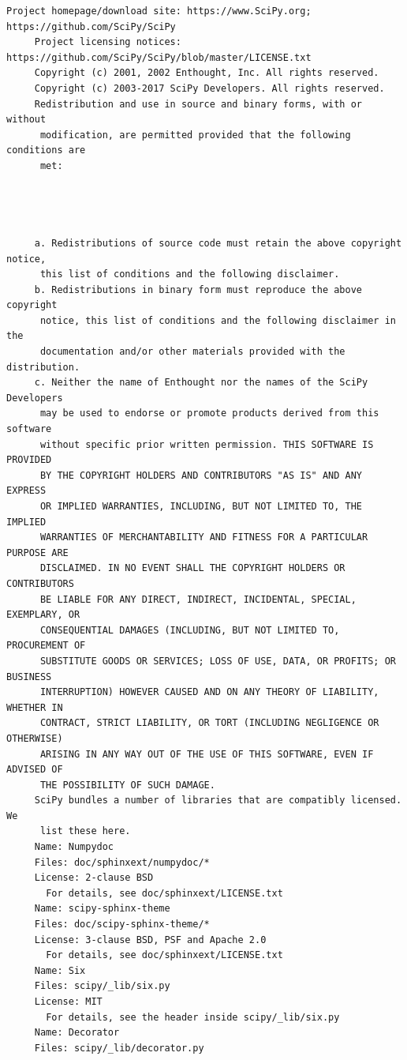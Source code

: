 \begin{lstlisting}[basicstyle=\ttfamily\footnotesize,breaklines=true]
     Project homepage/download site: https://www.SciPy.org; https://github.com/SciPy/SciPy
     Project licensing notices: https://github.com/SciPy/SciPy/blob/master/LICENSE.txt
     Copyright (c) 2001, 2002 Enthought, Inc. All rights reserved.
     Copyright (c) 2003-2017 SciPy Developers. All rights reserved.
     Redistribution and use in source and binary forms, with or without
      modification, are permitted provided that the following conditions are
      met:




     a. Redistributions of source code must retain the above copyright notice,
      this list of conditions and the following disclaimer.
     b. Redistributions in binary form must reproduce the above copyright
      notice, this list of conditions and the following disclaimer in the
      documentation and/or other materials provided with the distribution.
     c. Neither the name of Enthought nor the names of the SciPy Developers
      may be used to endorse or promote products derived from this software
      without specific prior written permission. THIS SOFTWARE IS PROVIDED
      BY THE COPYRIGHT HOLDERS AND CONTRIBUTORS "AS IS" AND ANY EXPRESS
      OR IMPLIED WARRANTIES, INCLUDING, BUT NOT LIMITED TO, THE IMPLIED
      WARRANTIES OF MERCHANTABILITY AND FITNESS FOR A PARTICULAR PURPOSE ARE
      DISCLAIMED. IN NO EVENT SHALL THE COPYRIGHT HOLDERS OR CONTRIBUTORS
      BE LIABLE FOR ANY DIRECT, INDIRECT, INCIDENTAL, SPECIAL, EXEMPLARY, OR
      CONSEQUENTIAL DAMAGES (INCLUDING, BUT NOT LIMITED TO, PROCUREMENT OF
      SUBSTITUTE GOODS OR SERVICES; LOSS OF USE, DATA, OR PROFITS; OR BUSINESS
      INTERRUPTION) HOWEVER CAUSED AND ON ANY THEORY OF LIABILITY, WHETHER IN
      CONTRACT, STRICT LIABILITY, OR TORT (INCLUDING NEGLIGENCE OR OTHERWISE)
      ARISING IN ANY WAY OUT OF THE USE OF THIS SOFTWARE, EVEN IF ADVISED OF
      THE POSSIBILITY OF SUCH DAMAGE.
     SciPy bundles a number of libraries that are compatibly licensed. We
      list these here.
     Name: Numpydoc
     Files: doc/sphinxext/numpydoc/*
     License: 2-clause BSD
       For details, see doc/sphinxext/LICENSE.txt
     Name: scipy-sphinx-theme
     Files: doc/scipy-sphinx-theme/*
     License: 3-clause BSD, PSF and Apache 2.0
       For details, see doc/sphinxext/LICENSE.txt
     Name: Six
     Files: scipy/_lib/six.py
     License: MIT
       For details, see the header inside scipy/_lib/six.py
     Name: Decorator
     Files: scipy/_lib/decorator.py

\end{lstlisting}

